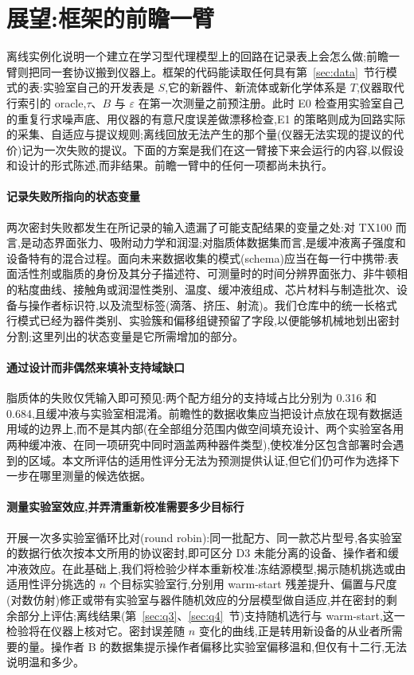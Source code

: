 \documentclass[11pt,a4paper]{ctexart}
\begin{document}
\section{展望:框架的前瞻一臂}
\label{sec:outlook}
离线实例化说明一个建立在学习型代理模型上的回路在记录表上会怎么做;前瞻一臂则把同一套协议搬到仪器上。框架的代码能读取任何具有第~\ref{sec:data}~节行模式的表:实验室自己的开发表是 $S$,它的新器件、新流体或新化学体系是 $T$,仪器取代行索引的 oracle,$\tau$、$B$ 与 $\varepsilon$ 在第一次测量之前预注册。此时 E0 检查用实验室自己的重复行求噪声底、用仪器的有意尺度误差做漂移检查,E1 的策略则成为回路实际的采集、自适应与提议规则;离线回放无法产生的那个量(仪器无法实现的提议的代价)记为一次失败的提议。下面的方案是我们在这一臂接下来会运行的内容,以假设和设计的形式陈述,而非结果。前瞻一臂中的任何一项都尚未执行。

\paragraph{记录失败所指向的状态变量} 两次密封失败都发生在所记录的输入遗漏了可能支配结果的变量之处:对 TX100 而言,是动态界面张力、吸附动力学和润湿;对脂质体数据集而言,是缓冲液离子强度和设备特有的混合过程。面向未来数据收集的模式(schema)应当在每一行中携带:表面活性剂或脂质的身份及其分子描述符、可测量时的时间分辨界面张力、非牛顿相的粘度曲线、接触角或润湿性类别、温度、缓冲液组成、芯片材料与制造批次、设备与操作者标识符,以及流型标签(滴落、挤压、射流)。我们仓库中的统一长格式行模式已经为器件类别、实验簇和偏移组键预留了字段,以便能够机械地划出密封分割;这里列出的状态变量是它所需增加的部分。

\paragraph{通过设计而非偶然来填补支持域缺口} 脂质体的失败仅凭输入即可预见:两个配方组分的支持域占比分别为 0.316 和 0.684,且缓冲液与实验室相混淆。前瞻性的数据收集应当把设计点放在现有数据适用域的边界上,而不是其内部(在全部组分范围内做空间填充设计、两个实验室各用两种缓冲液、在同一项研究中同时涵盖两种器件类型),使校准分区包含部署时会遇到的区域。本文所评估的适用性评分无法为预测提供认证,但它们仍可作为选择下一步在哪里测量的候选依据。

\paragraph{测量实验室效应,并弄清重新校准需要多少目标行} 开展一次多实验室循环比对(round robin):同一批配方、同一款芯片型号,各实验室的数据行依次按本文所用的协议密封,即可区分 D3 未能分离的设备、操作者和缓冲液效应。在此基础上,我们将检验少样本重新校准:冻结源模型,揭示随机挑选或由适用性评分挑选的 $n$ 个目标实验室行,分别用 warm-start 残差提升、偏置与尺度(对数仿射)修正或带有实验室与器件随机效应的分层模型做自适应,并在密封的剩余部分上评估;离线结果(第~\ref{sec:q3}、\ref{sec:q4}~节)支持随机选行与 warm-start,这一检验将在仪器上核对它。密封误差随 $n$ 变化的曲线,正是转用新设备的从业者所需要的量。操作者 B 的数据集提示操作者偏移比实验室偏移温和,但仅有十二行,无法说明温和多少。
\end{document}
